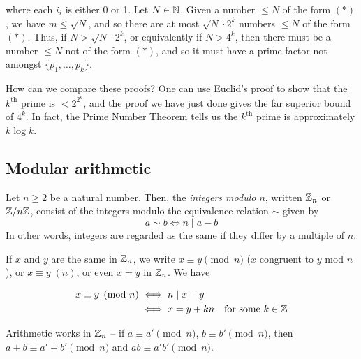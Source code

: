 \documentclass{../template/note}
\begin{document}
\begin{enumerate}[label=\protect\circled{\arabic*}]
        where each \(i_i\) is either 0 or 1. Let \(N \in \mathbb N\). Given a number \(\leq N\) of the form \((*)\), we have \(m \leq \sqrt N\), and so there are at most \(\sqrt N \cdot 2^k\) numbers \(\leq N\) of the form \((*)\). Thus, if \(N > \sqrt N \cdot 2^k\), or equivalently if \(N > 4^k\), then there must be a number \(\leq N\) not of the form \((*)\), and so it must have a prime factor not amongst \(\{p_1, \dots, p_k\}\).

        How can we compare these proofs? One can use Euclid's proof to show that the \(k^\text{th}\) prime is \(< 2^{2^k}\), and the proof we have just done gives the far superior bound of \(4^k\). In fact, the Prime Number Theorem tells us the \(k^\text{th}\) prime is approximately \(k \log k\).
    \end{enumerate}
    
    \subsection{Modular arithmetic}

    \begin{definition}
        Let \(n \geq 2\) be a natural number. Then, the \emph{integers modulo \(n\)}, written \(\mathbb Z_n\) or \(\mathbb Z/n\mathbb Z\), consist of the integers modulo the equivalence relation \(\sim\) given by
        \[
            a \sim b \iff n \mid a-b
        \]
        In other words, integers are regarded as the same if they differ by a multiple of \(n\).
    \end{definition}
    If \(x\) and \(y\) are the same in \(\mathbb Z_n\), we write \(x \equiv y \pmod n\) (\(x\) congruent to \(y\) mod \(n\)), or \(x \equiv y \; (n)\), or even \(x = y\) in \(\mathbb Z_n\). We have

    \begin{align*}
        x \equiv y \pmod n &\iff n \mid x - y \\
        &\iff x = y + kn \quad \text{for some } k \in \mathbb Z
    \end{align*}
    
    \begin{proposition}
        Arithmetic works in \(\mathbb Z_n\) -- if \(a \equiv a' \pmod n\), \(b \equiv b' \pmod n\), then \(a + b \equiv a' + b' \pmod n\) and \(ab \equiv a'b' \pmod n\).
    \end{proposition}
    
\end{document}
